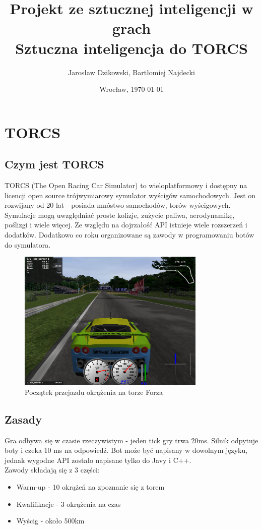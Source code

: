 \documentclass{article}
\author{Jarosław Dzikowski, Bartłomiej Najdecki}
\date{Wrocław, \today}
\title{\textbf{Projekt ze sztucznej inteligencji w grach} \\  Sztuczna inteligencja do TORCS}
\begin{document}
\maketitle

\tableofcontents

\section{TORCS}

\subsection{Czym jest TORCS}
TORCS (The Open Racing Car Simulator) to wieloplatformowy i dostępny na licencji open source trójwymiarowy symulator wyścigów samochodowych. Jest on rozwijany od 20 lat - posiada mnóstwo samochodów, torów wyścigowych. Symulacje mogą uwzględniać proste kolizje, zużycie paliwa, aerodynamikę, poślizgi i wiele więcej. Ze względu na dojrzałość API istnieje wiele rozszerzeń i dodatków. Dodatkowo co roku organizowane są zawody w programowaniu botów do symulatora.

\begin{figure}[H]
	\centering
    \includegraphics[width=0.8\textwidth]{torcs.png}
    \caption{Początek przejazdu okrążenia na torze Forza}
\end{figure}
\subsection{Zasady}
Gra odbywa się w czasie rzeczywistym - jeden tick gry trwa 20ms. Silnik odpytuje boty i czeka 10 ms na odpowiedź. Bot może być napisany w dowolnym języku, jednak wygodne API zostało napisane tylko do Javy i C++.\\
Zawody składają się z 3 części:\\
\begin{itemize}
\item Warm-up - 10 okrążeń na zpoznanie się z torem
\item Kwalifikacje - 3 okrążenia na czas
\item Wyścig - około 500km
\end{itemize}
\end{document}
